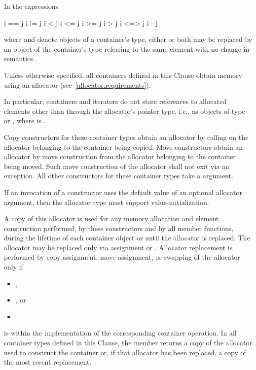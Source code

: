 \pnum
In the expressions
\begin{codeblock}
i == j
i != j
i < j
i <= j
i >= j
i > j
i <=> j
i - j
\end{codeblock}
where  and  denote objects of a container's 
type, either or both may be replaced by an object of the container's
 type referring to the same element with no change in semantics.

\pnum
Unless otherwise specified, all containers defined in this Clause obtain memory
using an allocator (see~\ref{allocator.requirements}).
\begin{note}
In particular, containers and iterators do not store references
to allocated elements other than through the allocator's pointer type,
i.e., as objects of type  or
,
where  is .
\end{note}
Copy constructors for these container types obtain an allocator by calling
on the allocator belonging to the container being copied.
Move constructors obtain an allocator by move construction from the allocator belonging to
the container being moved. Such move construction of the allocator shall not exit via an
exception.
All other constructors for these container types take a
 argument.
\begin{note}
If an invocation of a constructor uses the default value of an optional
allocator argument, then the allocator type must support value-initialization.
\end{note}
A copy of this allocator is used for any memory allocation and element construction
performed, by these constructors and by all member functions,
during the lifetime of each container object
or until the allocator is replaced. The allocator may be replaced only via assignment or
. Allocator replacement is performed by
copy assignment, move assignment, or swapping of the allocator only if
\begin{itemize}
\item {},
\item {},
or
\item {}
\end{itemize}
is 
within the implementation of the corresponding container operation.
In all container types defined in this Clause, the member 
returns a copy of the allocator used to construct the container or, if that allocator
has been replaced, a copy of the most recent replacement.

